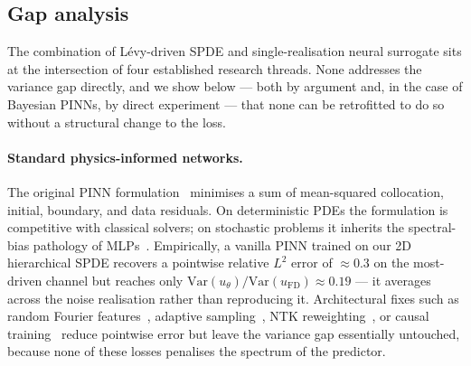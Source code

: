 \documentclass[review,12pt]{elsarticle}
\begin{document}
\subsection{Gap analysis}
\label{subsec:gap-analysis}

The combination of L\'evy-driven SPDE and single-realisation neural
surrogate sits at the intersection of four established research
threads. None addresses the variance gap directly, and we show below
--- both by argument and, in the case of Bayesian PINNs, by direct
experiment --- that none can be retrofitted to do so without a
structural change to the loss.

\paragraph{Standard physics-informed networks.}
The original PINN formulation~\cite{Raissi2019} minimises a sum of
mean-squared collocation, initial, boundary, and data residuals. On
deterministic PDEs the formulation is competitive with classical
solvers; on stochastic problems it inherits the spectral-bias
pathology of MLPs~\cite{Rahaman2019,Tancik2020}. Empirically, a
vanilla PINN trained on our 2D hierarchical SPDE recovers a pointwise
relative \(L^2\) error of \(\approx 0.3\) on the most-driven channel
but reaches only
\(\mathrm{Var}(u_\theta)/\mathrm{Var}(u_{\mathrm{FD}})\approx 0.19\)
--- it averages across the noise realisation rather than reproducing
it. Architectural fixes such as random Fourier
features~\cite{Tancik2020}, adaptive sampling~\cite{Lu2021DeepONet},
NTK reweighting~\cite{Wang2022}, or causal
training~\cite{Wang2024Causal} reduce pointwise error but leave the
variance gap essentially untouched, because none of these losses
penalises the spectrum of the predictor.
\end{document}
